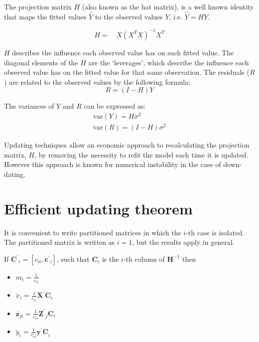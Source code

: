 \documentclass[12pt, a4paper]{report}
\theoremstyle{plain}
\theoremstyle{definition}
\theoremstyle{remark}
\begin{document}
	The projection matrix $H$ (also known as the hat matrix), is a
	well known identity that maps the fitted values $\hat{Y}$ to the
	observed values $Y$, i.e. $\hat{Y} = HY$.
	
	\begin{equation}
	H =\quad X(X^{T}X)^{-1}X^{T}
	\end{equation}
	
	$H$ describes the influence each observed value has on each fitted
	value. The diagonal elements of the $H$ are the `leverages', which
	describe the influence each observed value has on the fitted value
	for that same observation. The residuals ($R$) are related to the
	observed values by the following formula:
	\begin{equation}
	R = (I-H)Y
	\end{equation}
	
	The variances of $Y$ and $R$ can be expressed as:
	\begin{eqnarray}
	\mbox{var}(Y) = H\sigma^{2} \nonumber\\
	\mbox{var}(R) = (I-H)\sigma^{2}
	\end{eqnarray}
	
	Updating techniques allow an economic approach to recalculating
	the projection matrix, $H$, by removing the necessity to refit the
	model each time it is updated. However this approach is known for
	numerical instability in the case of down-dating.
	
	\section{Efficient updating theorem}
	
	It is convenient to write partitioned matrices in which the $i$-th case is isolated. The partitioned matrix is written as $ i = 1$, but the results apply in general.
	
	If $\boldsymbol{C^{\prime}}_{i}  = [c_{ii}, \boldsymbol{c^{\prime}}_{i}]$, such that  $\boldsymbol{C}_{i}$ is the
	$i$-th column of $\boldsymbol{H}^{-1}$ then
	
	
	\begin{itemize}
		\item $m_{i} = \frac{1}{c_{ii}}$\\
		\item $\breve{x}_{i} = \frac{1}{c_{ii}}\boldsymbol{X^{\prime}C}_{i}$\\
		\item $\breve{\boldsymbol{z}_{ji}} = \frac{1}{c_{ii}}\boldsymbol{Z^{\prime}}_{j}\boldsymbol{C}_{i}$\\
		\item $\breve{y}_{i} = \frac{1}{c_{ii}}\boldsymbol{y^{\prime}C}_{i}$\\
	\end{itemize}
	
\end{document}
